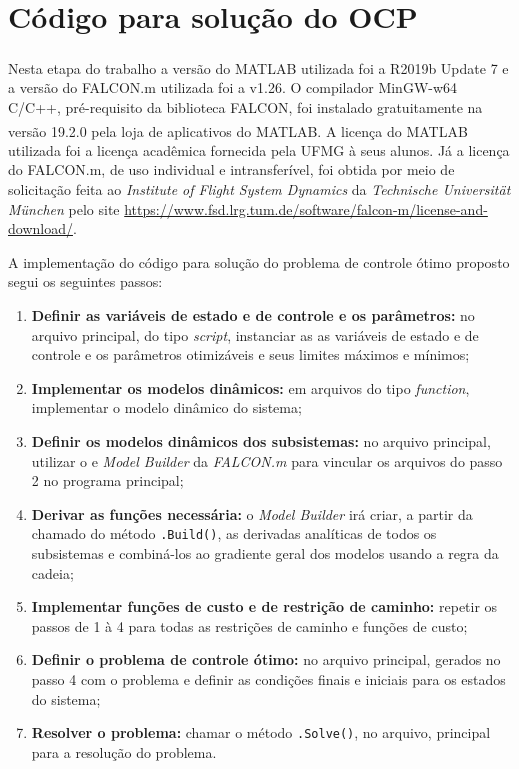 \section{Código para solução do OCP}
\label{sec:metodologia_codigos}

Nesta etapa do trabalho a versão do MATLAB\textsuperscript{\textregistered} utilizada foi a R2019b Update 7 e a versão do FALCON.m utilizada foi a v1.26.
O compilador MinGW-w64 C/C++, pré-requisito da biblioteca FALCON, foi instalado gratuitamente na versão 19.2.0 pela loja de aplicativos do MATLAB\textsuperscript{\textregistered}. 
A licença do MATLAB\textsuperscript{\textregistered} utilizada foi a licença acadêmica fornecida pela UFMG à seus alunos. Já a licença do FALCON.m, de uso individual e intransferível,
foi obtida por meio de solicitação feita ao \textit{Institute of Flight System Dynamics} da \textit{Technische Universit{\"a}t M{\"u}nchen} pelo site \url{https://www.fsd.lrg.tum.de/software/falcon-m/license-and-download/}.

A implementação do código para solução do problema de controle ótimo proposto segui os seguintes passos:

\begin{enumerate}
    \item \textbf{Definir as variáveis de estado e de controle e os parâmetros:} no arquivo principal, do tipo \textit{script}, instanciar as  as variáveis de estado e de controle e os parâmetros otimizáveis e seus limites máximos e mínimos;
    \item \textbf{Implementar os modelos dinâmicos:} em arquivos do tipo \textit{function}, implementar o modelo dinâmico do sistema; 
    \item \textbf{Definir os modelos dinâmicos dos subsistemas:} no arquivo principal, utilizar o e \textit{Model Builder} da \textit{FALCON.m} para vincular os arquivos do passo 2 no programa principal;
    \item \textbf{Derivar as funções necessária:} o \textit{Model Builder} irá criar, a partir da chamado do método \lstinline[style=Matlab-editor]{.Build()}, as derivadas analíticas de todos os subsistemas e combiná-los ao gradiente geral dos modelos usando a regra da cadeia;
    \item \textbf{Implementar funções de custo e de restrição de caminho:} repetir os passos de 1 à 4 para todas as restrições de caminho e funções de custo;
    \item \textbf{Definir o problema de controle ótimo:}  no arquivo principal, gerados no passo 4 com o problema e definir as condições finais e iniciais para os estados do sistema;
    \item \textbf{Resolver o problema:} chamar o método \lstinline[style=Matlab-editor]{.Solve()}, no arquivo, principal para a resolução do problema.
\end{enumerate}

